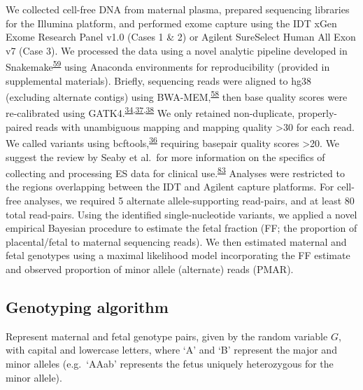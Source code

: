 \documentclass[11pt,letterpaper]{book}
\begin{document}
We collected cell-free DNA from maternal plasma, prepared sequencing libraries for the Illumina platform, and performed exome capture using the IDT xGen Exome Research Panel v1.0 (Cases 1 \& 2) or Agilent SureSelect Human All Exon v7 (Case 3).
We processed the data using a novel analytic pipeline developed in Snakemake\textsuperscript{\protect\hyperlink{ref-koster:2012aa}{59}} using Anaconda environments for reproducibility (provided in supplemental materials).
Briefly, sequencing reads were aligned to hg38 (excluding alternate contigs) using BWA-MEM,\textsuperscript{\protect\hyperlink{ref-li:2013ab}{58}} then base quality scores were re-calibrated using GATK4.\textsuperscript{\protect\hyperlink{ref-mckenna:2010aa}{34},\protect\hyperlink{ref-van-der-auwera:2013aa}{37},\protect\hyperlink{ref-poplin:2018aa}{38}}
We only retained non-duplicate, properly-paired reads with unambiguous mapping and mapping quality \textgreater30 for each read.
We called variants using bcftools,\textsuperscript{\protect\hyperlink{ref-li:2011aa}{36}} requiring basepair quality scores \textgreater20.
We suggest the review by Seaby et al.~for more information on the specifics of collecting and processing ES data for clinical use.\textsuperscript{\protect\hyperlink{ref-seaby:2016aa}{83}}
Analyses were restricted to the regions overlapping between the IDT and Agilent capture platforms.
For cell-free analyses, we required 5 alternate allele-supporting read-pairs, and at least 80 total read-pairs.
Using the identified single-nucleotide variants, we applied a novel empirical Bayesian procedure to estimate the fetal fraction (FF; the proportion of placental/fetal to maternal sequencing reads).
We then estimated maternal and fetal genotypes using a maximal likelihood model incorporating the FF estimate and observed proportion of minor allele (alternate) reads (PMAR).

\hypertarget{genotyping-algorithm}{%
\subsection{Genotyping algorithm}\label{genotyping-algorithm}}

\newcommand{\Var}[2][]{\text{Var}_{#1}\left(#2\right)}
\newcommand\I[1]{\text{I}\left(#1\right)}

Represent maternal and fetal genotype pairs, given by the random variable \(G\), with capital and lowercase letters, where `A' and `B' represent the major and minor alleles (e.g.~`AAab' represents the fetus uniquely heterozygous for the minor allele).
\end{document}
